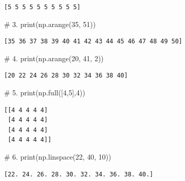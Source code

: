 \documentclass[
  letterpaper,
  DIV=11,
  numbers=noendperiod]{scrreprt}
\newenvironment{Shaded}{\begin{snugshade}}{\end{snugshade}}
\newcommand{\BuiltInTok}[1]{\textcolor[rgb]{0.00,0.23,0.31}{#1}}
\newcommand{\CommentTok}[1]{\textcolor[rgb]{0.37,0.37,0.37}{#1}}
\newcommand{\DecValTok}[1]{\textcolor[rgb]{0.68,0.00,0.00}{#1}}
\newcommand{\NormalTok}[1]{\textcolor[rgb]{0.00,0.23,0.31}{#1}}
\begin{document}
\begin{tcolorbox}
\begin{tcolorbox}
\begin{verbatim}
[5 5 5 5 5 5 5 5 5 5]
\end{verbatim}

\begin{Shaded}
\begin{Highlighting}[]
\CommentTok{\# 3. }
\BuiltInTok{print}\NormalTok{(np.arange(}\DecValTok{35}\NormalTok{, }\DecValTok{51}\NormalTok{))}
\end{Highlighting}
\end{Shaded}

\begin{verbatim}
[35 36 37 38 39 40 41 42 43 44 45 46 47 48 49 50]
\end{verbatim}

\begin{Shaded}
\begin{Highlighting}[]
\CommentTok{\# 4. }
\BuiltInTok{print}\NormalTok{(np.arange(}\DecValTok{20}\NormalTok{, }\DecValTok{41}\NormalTok{, }\DecValTok{2}\NormalTok{))}
\end{Highlighting}
\end{Shaded}

\begin{verbatim}
[20 22 24 26 28 30 32 34 36 38 40]
\end{verbatim}

\begin{Shaded}
\begin{Highlighting}[]
\CommentTok{\# 5. }
\BuiltInTok{print}\NormalTok{(np.full([}\DecValTok{4}\NormalTok{,}\DecValTok{5}\NormalTok{],}\DecValTok{4}\NormalTok{))}
\end{Highlighting}
\end{Shaded}

\begin{verbatim}
[[4 4 4 4 4]
 [4 4 4 4 4]
 [4 4 4 4 4]
 [4 4 4 4 4]]
\end{verbatim}

\begin{Shaded}
\begin{Highlighting}[]
\CommentTok{\# 6. }
\BuiltInTok{print}\NormalTok{(np.linspace(}\DecValTok{22}\NormalTok{, }\DecValTok{40}\NormalTok{, }\DecValTok{10}\NormalTok{))}
\end{Highlighting}
\end{Shaded}

\begin{verbatim}
[22. 24. 26. 28. 30. 32. 34. 36. 38. 40.]
\end{verbatim}

\end{tcolorbox}

\end{tcolorbox}
\end{document}
